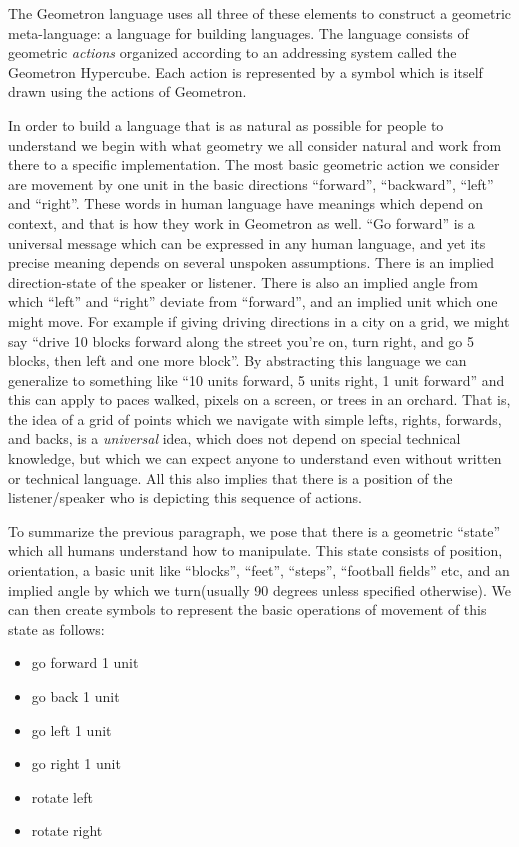 \documentclass[12pt,a4paper]{amsart}
\numberwithin{equation}{section}
\begin{document}
The Geometron language uses all three of these elements to construct a
geometric meta-language: a language for building languages. The language
consists of geometric \emph{actions} organized according to an
addressing system called the Geometron Hypercube. Each action is
represented by a symbol which is itself drawn using the actions of
Geometron.

In order to build a language that is as natural as possible for people
to understand we begin with what geometry we all consider natural and
work from there to a specific implementation. The most basic geometric
action we consider are movement by one unit in the basic directions
``forward'', ``backward'', ``left'' and ``right''. These words in human
language have meanings which depend on context, and that is how they
work in Geometron as well. ``Go forward'' is a universal message which
can be expressed in any human language, and yet its precise meaning
depends on several unspoken assumptions. There is an implied
direction-state of the speaker or listener. There is also an implied
angle from which ``left'' and ``right'' deviate from ``forward'', and an
implied unit which one might move. For example if giving driving
directions in a city on a grid, we might say ``drive 10 blocks forward
along the street you're on, turn right, and go 5 blocks, then left and
one more block''. By abstracting this language we can generalize to
something like ``10 units forward, 5 units right, 1 unit forward'' and
this can apply to paces walked, pixels on a screen, or trees in an
orchard. That is, the idea of a grid of points which we navigate with
simple lefts, rights, forwards, and backs, is a \emph{universal} idea,
which does not depend on special technical knowledge, but which we can
expect anyone to understand even without written or technical language.
All this also implies that there is a position of the listener/speaker
who is depicting this sequence of actions.

To summarize the previous paragraph, we pose that there is a geometric
``state'' which all humans understand how to manipulate. This state
consists of position, orientation, a basic unit like ``blocks'',
``feet'', ``steps'', ``football fields'' etc, and an implied angle by
which we turn(usually 90 degrees unless specified otherwise). We can
then create symbols to represent the basic operations of movement of
this state as follows:

\begin{itemize}
\item
  go forward 1 unit
\item
  go back 1 unit
\item
  go left 1 unit
\item
  go right 1 unit
\item
  rotate left
\item
  rotate right
\end{itemize}
\end{document}

